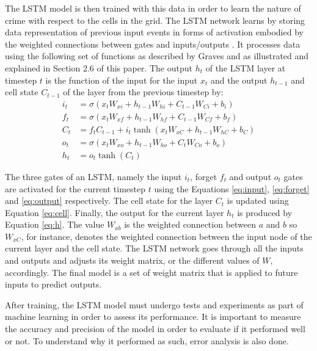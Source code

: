 The LSTM model is then trained with this data in order to learn the nature of crime with respect to the cells in the grid. The LSTM network learns by storing data representation of previous input events in forms of activation embodied by the weighted connections between gates and inputs/outputs \citep{hochreiter1997long}. It processes data using the following set of functions as described by Graves \citeyearpar{graves2013generating} and as illustrated and explained in Section 2.6 of this paper. The output \( h_t \) of the LSTM layer at timestep $t$ is the function of the input for the input \( x_t \) and the output \( h_{t-1} \) and cell state \( C_{t-1} \) of the layer from the previous timestep by:
    \begin{align}
    i_t &= \sigma(x_t W_{xi} + h_{t-1} W_{hi} + C_{t-1} W_{Ci} + b_i) \label{eq:input}\\
    f_t &= \sigma(x_t W_{xf} + h_{t-1} W_{hf} + C_{t-1} W_{Cf} + b_f) \label{eq:forget}\\
    C_t &= f_t C_{t-1} + i_t \tanh(x_t W_{xC} + h_{t-1} W_{hC} + b_C) \label{eq:cell}\\
    o_t &= \sigma(x_t W_{xo} + h_{t-1} W_{ho} + C_t W_{Co} + b_o) \label{eq:output} \\
    h_t &= o_t \tanh(C_t) \label{eq:h}
    \end{align}

The three gates of an LSTM, namely the input \( i_t \), forget \( f_t \) and output \( o_t \) gates are activated for the current timestep $t$ using the Equations \ref{eq:input}, \ref{eq:forget} and \ref{eq:output} respectively. The cell state for the layer \( C_t \) is updated using Equation \ref{eq:cell}. Finally, the output for the current layer \( h_t \) is produced by Equation \ref{eq:h}. The value \(W_{ab}\) is the weighted connection between $a$ and $b$ so \(W_{xC}\), for instance, denotes the weighted connection between the input node of the current layer and the cell state. The LSTM network goes through all the inputs and outputs and adjusts its weight matrix, or the different values of $W$, accordingly. The final model is a set of weight matrix that is applied to future inputs to predict outputs.

After training, the LSTM model must undergo tests and experiments as part of machine learning in order to assess its performance. It is important to measure the accuracy and precision of the model in order to evaluate if it performed well or not. To understand why it performed as such, error analysis is also done.

